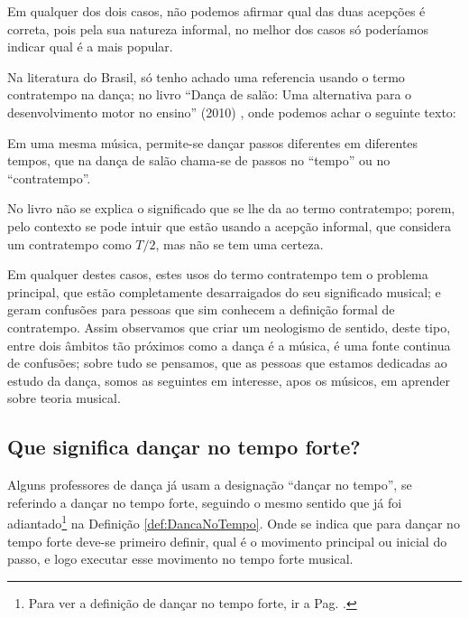 Em qualquer dos dois casos, não podemos afirmar qual das duas acepções é correta,
pois pela sua natureza informal,
no melhor dos casos só poderíamos indicar qual é a mais popular.

Na literatura do Brasil, só tenho achado uma referencia usando o termo contratempo na dança;
no livro ``Dança de salão: Uma alternativa para o desenvolvimento motor no ensino'' 
(2010) \cite{maia2010danca}, onde podemos achar o seguinte texto:
\begin{citando}
Em uma mesma música, permite-se dançar passos diferentes em diferentes tempos,
que na dança de salão chama-se de passos no ``tempo'' ou no ``contratempo''.
\end{citando}
No livro não se explica o significado que se lhe da ao termo contratempo;
porem, pelo contexto se pode intuir que estão usando a acepção informal, 
que considera um contratempo como $T/2$, mas não se tem uma certeza.

Em qualquer destes casos, 
estes usos do termo contratempo tem o problema principal, 
que estão completamente desarraigados do seu significado musical;
e geram confusões para pessoas que sim conhecem a definição formal de contratempo.
Assim observamos que criar um neologismo de sentido, deste tipo, 
entre dois âmbitos tão próximos como a dança é a música, é uma fonte continua de confusões;
sobre tudo se pensamos, que as pessoas que estamos dedicadas ao estudo da dança,
somos as seguintes em interesse, apos os músicos, em aprender sobre teoria musical.


\subsection{Que significa dançar no tempo forte?}
\label{subsec:dancatempoforte}
Alguns professores de dança já usam a designação ``dançar no tempo'', 
se referindo a dançar no tempo forte, seguindo o mesmo sentido que já foi adiantado\footnote{Para 
ver a definição de dançar no tempo forte, ir a Pag. \pageref{def:DancaNoTempo}.}
 na Definição \ref{def:DancaNoTempo}.
Onde se indica que para dançar no tempo forte deve-se primeiro definir,
 qual é o movimento principal ou inicial do passo,
e logo executar esse movimento no tempo forte musical.


